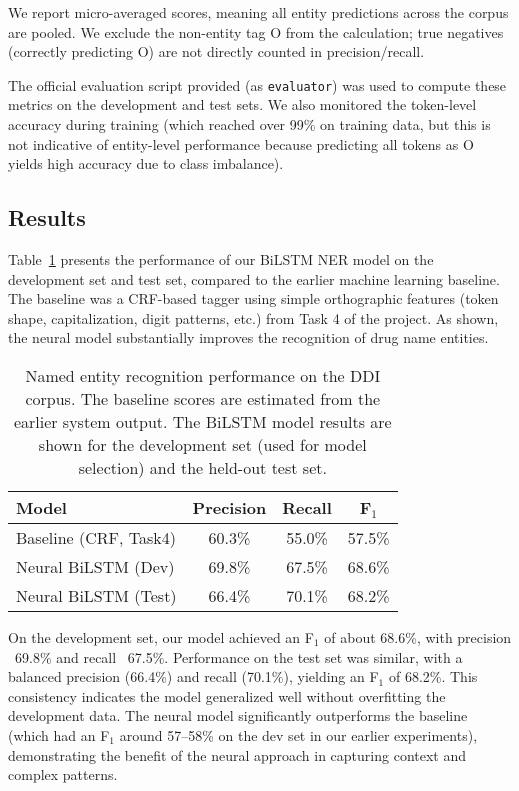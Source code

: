 We report micro-averaged scores, meaning all entity predictions across the corpus are pooled. We exclude the non-entity tag O from the calculation; true negatives (correctly predicting O) are not directly counted in precision/recall.

The official evaluation script provided (as \texttt{evaluator}) was used to compute these metrics on the development and test sets. We also monitored the token-level accuracy during training (which reached over 99\% on training data, but this is not indicative of entity-level performance because predicting all tokens as O yields high accuracy due to class imbalance).

\subsection{Results}
Table~\ref{tab:results} presents the performance of our BiLSTM NER model on the development set and test set, compared to the earlier machine learning baseline. The baseline was a CRF-based tagger using simple orthographic features (token shape, capitalization, digit patterns, etc.) from Task 4 of the project. As shown, the neural model substantially improves the recognition of drug name entities.

\begin{table}[h]\centering
\begin{tabular}{lccc}
\toprule
\textbf{Model} & \textbf{Precision} & \textbf{Recall} & \textbf{F$_1$} \\
\midrule
Baseline (CRF, Task4) & 60.3\% & 55.0\% & 57.5\% \\
Neural BiLSTM (Dev)   & 69.8\% & 67.5\% & 68.6\% \\
Neural BiLSTM (Test)  & 66.4\% & 70.1\% & 68.2\% \\
\bottomrule
\end{tabular}
\caption{Named entity recognition performance on the DDI corpus. The baseline scores are estimated from the earlier system output. The BiLSTM model results are shown for the development set (used for model selection) and the held-out test set.}
\label{tab:results}
\end{table}

On the development set, our model achieved an F$_1$ of about 68.6\%, with precision ~69.8\% and recall ~67.5\%. Performance on the test set was similar, with a balanced precision (66.4\%) and recall (70.1\%), yielding an F$_1$ of 68.2\%. This consistency indicates the model generalized well without overfitting the development data. The neural model significantly outperforms the baseline (which had an F$_1$ around 57--58\% on the dev set in our earlier experiments), demonstrating the benefit of the neural approach in capturing context and complex patterns.

